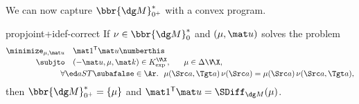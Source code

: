 %
%
We can now capture $\bbr{\dg M}^*_{0^+}$ with a convex program.

\begin{linked}{prop}{joint+idef-correct}
If $\nu \in \bbr{\dg M}_0^*$
and $(\mu, \mat u)$ 
solves the problem
\begin{align*}
    \minimize_{\mu, \mat u} & \quad
        \smash{\mat 1^{\sf T} \mat u}
        \numberthis\label{prob:joint+idef}\\[-0.5ex]
    \subjto &\quad
        (-\mat u,  \mu, \mat k ) \in K_{\exp}^{\V\!\X},~~\quad \mu \in \Delta\V\!\X, \\[-0.4ex]
            \forall& \ed aST \subafalse \in \Ar.~~\mu(\Src a, \Tgt a)\, \nu(\Src a) = \mu(\Src a)\, \nu(\Src a, \Tgt a),
\end{align*}
\vspace{-0.3ex}
then $\bbr{\dg M}^*_{0^+} = \{ \mu \}$
and $\mat 1^{\sf T} \mat u = \SDiff_{\dg M}(\mu)$.
\end{linked}

